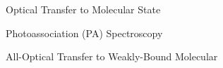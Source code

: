 \documentclass{beamer}
\begin{document}

\begin{frame}{Optical Transfer to Molecular State}
\end{frame}





\begin{frame}{Photoassociation (PA) Spectroscopy}
\end{frame}

\begin{frame}{All-Optical Transfer to Weakly-Bound Molecular}
\end{frame}
\end{document}
